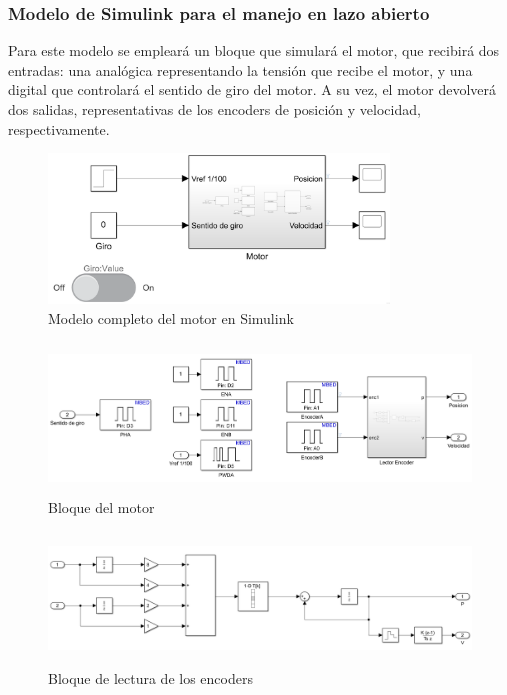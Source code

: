\documentclass[a4paper, 12pt]{article}
\begin{document}
\subsubsection{Modelo de Simulink para el manejo en lazo abierto}
Para este modelo se empleará un bloque que simulará el motor, que recibirá dos entradas: una analógica representando la tensión que recibe el motor, y una digital que controlará el sentido de giro del motor. 
A su vez, el motor devolverá dos salidas, representativas de los encoders de posición y velocidad, respectivamente. 
\begin{figure}[h!]
	\centering
	\includegraphics[height=4cm]{figs/motorbb.png}
	\caption{Modelo completo del motor en Simulink}
\end{figure}
\begin{figure}[h!]
	\centering
	\includegraphics[height = 4cm]{figs/motorbb_inside.png}
	\caption{Bloque del motor}
\end{figure}
\begin{figure}[h!]
	\centering
	\includegraphics[height = 3.5cm]{figs/lector_encoders.png}
	\caption{Bloque de lectura de los encoders}
\end{figure}
\end{document}
